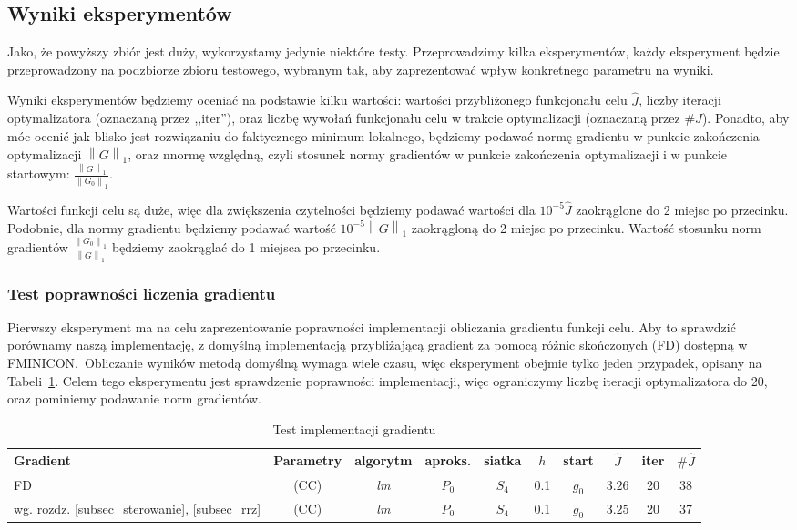\documentclass[11pt]{article}
\newcommand{\norm}[1]{\left\lVert#1\right\rVert}
\begin{document}
\subsection{Wyniki eksperymentów}
Jako, że powyższy zbiór jest duży, wykorzystamy jedynie niektóre testy. Przeprowadzimy kilka eksperymentów, każdy eksperyment będzie przeprowadzony na podzbiorze zbioru testowego, wybranym tak, aby zaprezentować wpływ konkretnego parametru na wyniki.

Wyniki eksperymentów będziemy oceniać na podstawie kilku wartości: wartości przybliżonego funkcjonału celu $\hat{J}$, liczby iteracji optymalizatora (oznaczaną przez ,,iter''), oraz liczbę wywołań funkcjonału celu w trakcie optymalizacji (oznaczaną przez $\#\hat{J}$). Ponadto, aby móc ocenić jak blisko jest rozwiązaniu do faktycznego minimum lokalnego, będziemy podawać normę gradientu w punkcie zakończenia optymalizacji $\norm{G}_1$, oraz nnormę względną, czyli stosunek normy gradientów w punkcie zakończenia optymalizacji i w punkcie startowym: $\frac{\norm{G}_1}{\norm{G_0}_1}$.

Wartości funkcji celu są duże, więc dla zwiększenia czytelności będziemy podawać wartości dla $10^{-5}\hat{J}$ zaokrąglone do 2 miejsc po przecinku. Podobnie, dla normy gradientu będziemy podawać wartość $10^{-5}\norm{G}_1$ zaokrągloną do 2 miejsc po przecinku. Wartość stosunku norm gradientów $\frac{\norm{G_0}_1}{\norm{G}_1}$ będziemy zaokrąglać do 1 miejsca po przecinku.
\subsubsection{Test poprawności liczenia gradientu}
Pierwszy eksperyment ma na celu zaprezentowanie poprawności implementacji obliczania gradientu funkcji celu. Aby to sprawdzić porównamy naszą implementację, z domyślną implementacją przybliżającą gradient za pomocą różnic skończonych (FD) dostępną w FMINICON.\ Obliczanie wyników metodą domyślną wymaga wiele czasu, więc eksperyment obejmie tylko jeden przypadek, opisany na Tabeli~\ref{test_tbl}. Celem tego eksperymentu jest sprawdzenie poprawności implementacji, więc ograniczymy liczbę iteracji optymalizatora do 20, oraz pominiemy podawanie norm gradientów.
\begin{table}[h]
  \begin{center}
    \begin{tabular}{|p{1.7cm}|c|c|c|c|c|c|c|c|c|}
      \hline
      Gradient & Parametry & algorytm & aproks. & siatka & $h$ & start & $\hat{J}$ & iter & $\#\hat{J}$ \\
      \hline
      FD & (CC) & {\it lm\/} & $P_0$ & $S_4$ & 0.1 & $g_0$ & $3.26$ & 20 & 38 \\
      \hline
      wg. rozdz. \ref{subsec_sterowanie}, \ref{subsec_rrz} & (CC) & {\it lm\/} & $P_0$ & $S_4$ & 0.1 & $g_0$ & $3.25$ & 20 & 37 \\
      \hline
    \end{tabular}
    \caption{Test implementacji gradientu}\label{test_tbl}
  \end{center}
\end{table}
\end{document}

